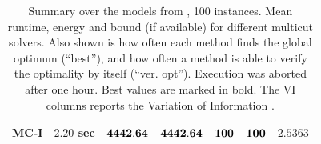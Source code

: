 \begin{table}
\begin{tabular}{lrrrrrr}
\cmidrule{1-1}                                                                                                             
                MC-I & $         2.20$ sec & $ {\bf4442.64}$ & $ {\bf4442.64}$ & ${\bf100}$ & ${\bf100}$  & $       2.5363$  \\ %
\bottomrule                                                               
\end{tabular}\hspace*{1cm}%
\caption{
Summary over the models from \cite{andres_2011_iccv}, 100 instances.
Mean runtime, energy and bound (if available) for different multicut solvers.
Also shown is how often each method finds the global optimum (``best''),
and how often a method is able to verify the optimality by itself
(``ver. opt'').
Execution was aborted after one hour.
Best values are marked in bold.
The VI columns reports the Variation of Information \cite{meila_2003_ltkm}.
}
\end{table}


